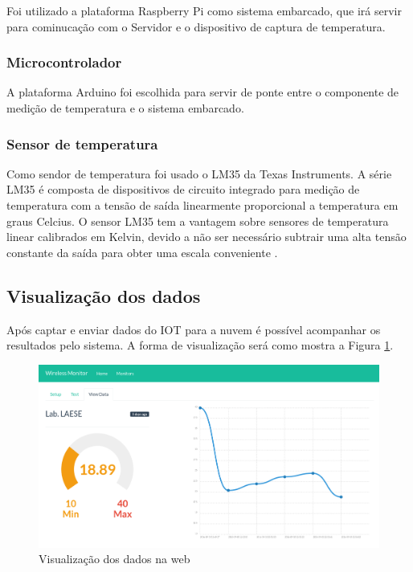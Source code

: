 Foi utilizado a plataforma Raspberry Pi como sistema embarcado, que irá
servir para cominucação com o Servidor e o dispositivo de captura de
temperatura.

\subsubsection{Microcontrolador}\label{microcontrolador}

A plataforma Arduino foi escolhida para servir de ponte entre o
componente de medição de temperatura e o sistema embarcado.

\subsubsection{Sensor de temperatura}\label{sensor-de-temperatura}

Como sendor de temperatura foi usado o LM35 da Texas Instruments. A
série LM35 é composta de dispositivos de circuito integrado para medição
de temperatura com a tensão de saída linearmente proporcional a
temperatura em graus Celcius. O sensor LM35 tem a vantagem sobre
sensores de temperatura linear calibrados em Kelvin, devido a não ser
necessário subtrair uma alta tensão constante da saída para obter uma
escala conveniente \cite{lm35:2016}.

\subsection{Visualização dos dados}\label{visualizauxe7uxe3o-dos-dados}

Após captar e enviar dados do IOT para a nuvem é possível acompanhar os
resultados pelo sistema. A forma de visualização será como mostra a
Figura \ref{fig:view-monitor}.

\begin{figure}[h]
    \centering
    \includegraphics[scale=0.35]{img/temperature-show.png}
    \caption{Visualização dos dados na web} \label{fig:view-monitor}
\end{figure}
